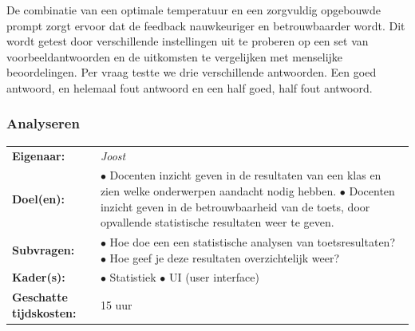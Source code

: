 \documentclass[12pt]{article}
\begin{document}
\noindent De combinatie van een optimale temperatuur en een zorgvuldig opgebouwde prompt zorgt ervoor dat de feedback nauwkeuriger en betrouwbaarder wordt. Dit wordt getest door verschillende instellingen uit te proberen op een set van voorbeeldantwoorden en de uitkomsten te vergelijken met menselijke beoordelingen. Per vraag testte we drie verschillende antwoorden. Een goed antwoord, en helemaal fout antwoord en een half goed, half fout antwoord.


\pagebreak



\subsubsection{Analyseren}
\begin{tabularx}{\linewidth}{@{}ll}
    \textbf{Eigenaar: } & \textit{Joost} \\
    \textbf{Doel(en): } & 
        \makecell[tl]{
            $\bullet$ Docenten inzicht geven in de resultaten van een klas en zien welke \\onderwerpen aandacht nodig hebben.\\
            $\bullet$ Docenten inzicht geven in de betrouwbaarheid van de toets, door opvallende \\ statistische resultaten weer te geven.\\
        } \\
    \textbf{Subvragen: } & 
        \makecell[tl]{
            $\bullet$ Hoe doe een een statistische analysen van toetsresultaten? \\
            $\bullet$ Hoe geef je deze resultaten overzichtelijk weer? \\
        }\\
    \textbf{Kader(s): } & 
        \makecell[tl]{
            $\bullet$ Statistiek \\
            $\bullet$ UI (user interface) \\
        }\\
    \parbox[t]{3cm}{\raggedright \textbf{Geschatte  tijdskosten:} } & 15 uur \\
\end{tabularx}
\\
\end{document}
